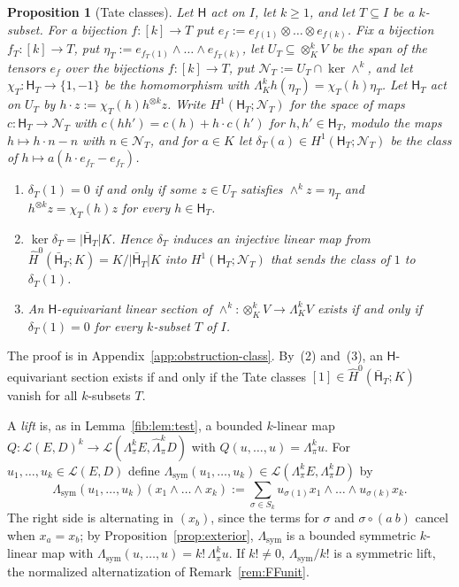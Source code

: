 \documentclass[11pt]{amsart}
\newtheorem{proposition}[theorem]{Proposition}
\theoremstyle{definition}
\theoremstyle{remark}
\numberwithin{equation}{section}
\newcommand{\cL}{\mathcal L}
\newcommand{\abs}[1]{\lvert #1\rvert}
\theoremstyle{plain}
\theoremstyle{definition}
\theoremstyle{plain}
\newcommand{\cN}{\mathcal N}
\newcommand{\Lsym}{\Lambda_{\mathrm{sym}}}
\begin{document}
\begin{proposition}[Tate classes]\label{can:prop:tate}
Let $\mathsf H$ act on $I$, let $k\ge1$, and let $T\subseteq I$ be a $k$\nobreakdash-subset. For a bijection
$f\colon[k]\to T$ put $e_f:=e_{f(1)}\otimes\dots\otimes e_{f(k)}$. Fix a bijection $f_T\colon[k]\to T$, put
$\eta_T:=e_{f_T(1)}\wedge\dots\wedge e_{f_T(k)}$, let $U_T\subseteq\otimes^k_KV$ be the span of the tensors $e_f$ over the
bijections $f\colon[k]\to T$, put $\cN_T:=U_T\cap\ker\wedge^k$, and let $\chi_T\colon\mathsf H_T\to\{1,-1\}$ be the
homomorphism with $\Lambda^k_Kh(\eta_T)=\chi_T(h)\eta_T$. Let $\mathsf H_T$ act on $U_T$ by
$h\cdot z:=\chi_T(h)h^{\otimes k}z$. Write $H^1(\mathsf H_T;\cN_T)$ for the space of maps $c\colon\mathsf H_T\to\cN_T$
with $c(hh')=c(h)+h\cdot c(h')$ for $h,h'\in\mathsf H_T$, modulo the maps $h\mapsto h\cdot n-n$ with $n\in\cN_T$, and for
$a\in K$ let $\delta_T(a)\in H^1(\mathsf H_T;\cN_T)$ be the class of $h\mapsto a(h\cdot e_{f_T}-e_{f_T})$.
\begin{enumerate}
\item $\delta_T(1)=0$ if and only if some $z\in U_T$ satisfies $\wedge^kz=\eta_T$ and $h^{\otimes k}z=\chi_T(h)z$ for
every $h\in\mathsf H_T$.
\item $\ker\delta_T=\abs{\bar{\mathsf H}_T}K$. Hence $\delta_T$ induces an injective linear map from
$\widehat H^0(\bar{\mathsf H}_T;K)=K/\abs{\bar{\mathsf H}_T}K$ into $H^1(\mathsf H_T;\cN_T)$ that sends the class of $1$
to $\delta_T(1)$.
\item An $\mathsf H$\nobreakdash-equivariant linear section of $\wedge^k\colon\otimes^k_KV\to\Lambda^k_KV$ exists if and
only if $\delta_T(1)=0$ for every $k$\nobreakdash-subset $T$ of $I$.
\end{enumerate}
\end{proposition}

The proof is in Appendix~\ref{app:obstruction-class}. By~(2) and~(3), an $\mathsf H$\nobreakdash-equivariant section
exists if and only if the Tate classes $[1]\in\widehat H^0(\bar{\mathsf H}_T;K)$ vanish for all $k$\nobreakdash-subsets $T$.

A \emph{lift} is, as in Lemma~\ref{fib:lem:test}, a bounded $k$\nobreakdash-linear map
$Q\colon\cL(E,D)^k\to\cL(\Lambda^k_\pi E,\widehat\Lambda^k_\pi D)$ with $Q(u,\dots,u)=\Lambda^k_\pi u$. For
$u_1,\dots,u_k\in\cL(E,D)$ define $\Lsym(u_1,\dots,u_k)\in\cL(\Lambda^k_\pi E,\Lambda^k_\pi D)$ by
\begin{equation}\label{can:eq:sym}
 \Lsym(u_1,\dots,u_k)(x_1\wedge\dots\wedge x_k):=\sum_{\sigma\in S_k}u_{\sigma(1)}x_1\wedge\dots\wedge u_{\sigma(k)}x_k .
\end{equation}
The right side is alternating in $(x_b)$, since the terms for $\sigma$ and $\sigma\circ(a\ b)$ cancel when $x_a=x_b$; by
Proposition~\ref{prop:exterior}, $\Lsym$ is a bounded symmetric $k$\nobreakdash-linear map with
$\Lsym(u,\dots,u)=k!\,\Lambda^k_\pi u$. If $k!\ne0$, $\Lsym/k!$ is a symmetric lift, the normalized alternatization of
Remark~\ref{rem:FFunit}.
\end{document}
